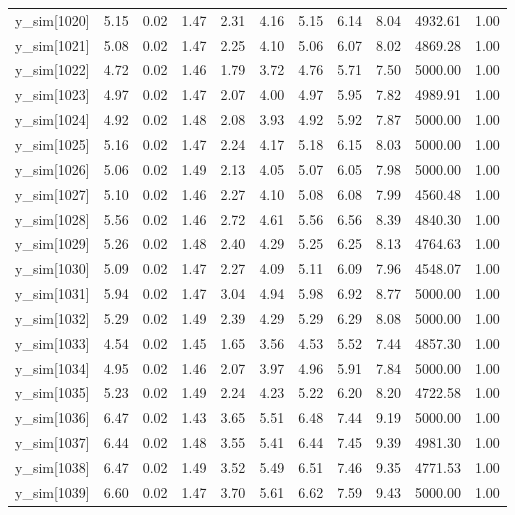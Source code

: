\begin{table}[ht]
\begin{tabular}{rrrrrrrrrrr}
  y\_sim[1020] & 5.15 & 0.02 & 1.47 & 2.31 & 4.16 & 5.15 & 6.14 & 8.04 & 4932.61 & 1.00 \\ 
  y\_sim[1021] & 5.08 & 0.02 & 1.47 & 2.25 & 4.10 & 5.06 & 6.07 & 8.02 & 4869.28 & 1.00 \\ 
  y\_sim[1022] & 4.72 & 0.02 & 1.46 & 1.79 & 3.72 & 4.76 & 5.71 & 7.50 & 5000.00 & 1.00 \\ 
  y\_sim[1023] & 4.97 & 0.02 & 1.47 & 2.07 & 4.00 & 4.97 & 5.95 & 7.82 & 4989.91 & 1.00 \\ 
  y\_sim[1024] & 4.92 & 0.02 & 1.48 & 2.08 & 3.93 & 4.92 & 5.92 & 7.87 & 5000.00 & 1.00 \\ 
  y\_sim[1025] & 5.16 & 0.02 & 1.47 & 2.24 & 4.17 & 5.18 & 6.15 & 8.03 & 5000.00 & 1.00 \\ 
  y\_sim[1026] & 5.06 & 0.02 & 1.49 & 2.13 & 4.05 & 5.07 & 6.05 & 7.98 & 5000.00 & 1.00 \\ 
  y\_sim[1027] & 5.10 & 0.02 & 1.46 & 2.27 & 4.10 & 5.08 & 6.08 & 7.99 & 4560.48 & 1.00 \\ 
  y\_sim[1028] & 5.56 & 0.02 & 1.46 & 2.72 & 4.61 & 5.56 & 6.56 & 8.39 & 4840.30 & 1.00 \\ 
  y\_sim[1029] & 5.26 & 0.02 & 1.48 & 2.40 & 4.29 & 5.25 & 6.25 & 8.13 & 4764.63 & 1.00 \\ 
  y\_sim[1030] & 5.09 & 0.02 & 1.47 & 2.27 & 4.09 & 5.11 & 6.09 & 7.96 & 4548.07 & 1.00 \\ 
  y\_sim[1031] & 5.94 & 0.02 & 1.47 & 3.04 & 4.94 & 5.98 & 6.92 & 8.77 & 5000.00 & 1.00 \\ 
  y\_sim[1032] & 5.29 & 0.02 & 1.49 & 2.39 & 4.29 & 5.29 & 6.29 & 8.08 & 5000.00 & 1.00 \\ 
  y\_sim[1033] & 4.54 & 0.02 & 1.45 & 1.65 & 3.56 & 4.53 & 5.52 & 7.44 & 4857.30 & 1.00 \\ 
  y\_sim[1034] & 4.95 & 0.02 & 1.46 & 2.07 & 3.97 & 4.96 & 5.91 & 7.84 & 5000.00 & 1.00 \\ 
  y\_sim[1035] & 5.23 & 0.02 & 1.49 & 2.24 & 4.23 & 5.22 & 6.20 & 8.20 & 4722.58 & 1.00 \\ 
  y\_sim[1036] & 6.47 & 0.02 & 1.43 & 3.65 & 5.51 & 6.48 & 7.44 & 9.19 & 5000.00 & 1.00 \\ 
  y\_sim[1037] & 6.44 & 0.02 & 1.48 & 3.55 & 5.41 & 6.44 & 7.45 & 9.39 & 4981.30 & 1.00 \\ 
  y\_sim[1038] & 6.47 & 0.02 & 1.49 & 3.52 & 5.49 & 6.51 & 7.46 & 9.35 & 4771.53 & 1.00 \\ 
  y\_sim[1039] & 6.60 & 0.02 & 1.47 & 3.70 & 5.61 & 6.62 & 7.59 & 9.43 & 5000.00 & 1.00 \\ 

\end{tabular}
\end{table}
